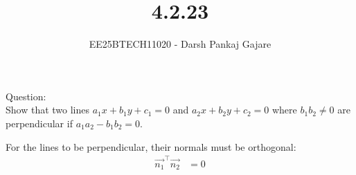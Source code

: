 \documentclass{beamer}
\title{4.2.23}
\author{EE25BTECH11020 - Darsh Pankaj Gajare}
\let\solution\relax
\numberwithin{equation}{section}
\begin{document}
\maketitle

Question:\\
Show that two lines $a_1x+b_1y+c_1=0$ and $a_2x+b_2y+c_2=0$ where $b_1b_2\neq0$ are perpendicular if $a_1a_2-b_1b_2=0$.\\
\solution
\begin{table}[H]
	\centering
	\caption{}
	
	\label{}
\end{table}

For the lines to be perpendicular, their normals must be orthogonal:
\begin{align}
    \vec{n_1}^\top \vec{n_2} &= 0
\end{align}
\end{document}

